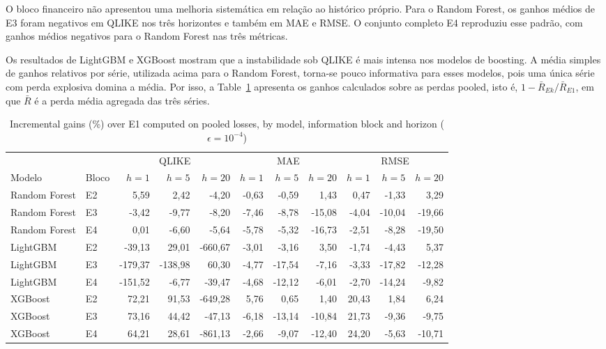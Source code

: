 \documentclass[a4paper,fleqn]{cas-sc}
\begin{document}
O bloco financeiro não apresentou uma melhoria sistemática em relação ao histórico próprio. Para o Random Forest, os ganhos médios de E3 foram negativos em QLIKE nos três horizontes e também em MAE e RMSE. O conjunto completo E4 reproduziu esse padrão, com ganhos médios negativos para o Random Forest nas três métricas.

Os resultados de LightGBM e XGBoost mostram que a instabilidade sob QLIKE é mais intensa nos modelos de boosting. A média simples de ganhos relativos por série, utilizada acima para o Random Forest, torna-se pouco informativa para esses modelos, pois uma única série com perda explosiva domina a média. Por isso, a Table~\ref{tab:ml_incremental_pooled} apresenta os ganhos calculados sobre as perdas pooled, isto é, \(1-\bar R_{Ek}/\bar R_{E1}\), em que \(\bar R\) é a perda média agregada das três séries.

\begin{table}[t]
\centering
\caption{Incremental gains (\%) over E1 computed on pooled losses, by model, information block and horizon (\(\epsilon=10^{-4}\))}
\label{tab:ml_incremental_pooled}
\scriptsize
\setlength{\tabcolsep}{3pt}
\begin{tabular*}{\textwidth}{@{\extracolsep{\fill}}llrrrrrrrrr@{}}
\hline
 & & \multicolumn{3}{c}{QLIKE} & \multicolumn{3}{c}{MAE} & \multicolumn{3}{c}{RMSE} \\
Modelo & Bloco & \(h=1\) & \(h=5\) & \(h=20\) & \(h=1\) & \(h=5\) & \(h=20\) & \(h=1\) & \(h=5\) & \(h=20\) \\
\hline
Random Forest & E2 & 5,59 & 2,42 & -4,20 & -0,63 & -0,59 & 1,43 & 0,47 & -1,33 & 3,29 \\
Random Forest & E3 & -3,42 & -9,77 & -8,20 & -7,46 & -8,78 & -15,08 & -4,04 & -10,04 & -19,66 \\
Random Forest & E4 & 0,01 & -6,60 & -5,64 & -5,78 & -5,32 & -16,73 & -2,51 & -8,28 & -19,50 \\
LightGBM & E2 & -39,13 & 29,01 & -660,67 & -3,01 & -3,16 & 3,50 & -1,74 & -4,43 & 5,37 \\
LightGBM & E3 & -179,37 & -138,98 & 60,30 & -4,77 & -17,54 & -7,16 & -3,33 & -17,82 & -12,28 \\
LightGBM & E4 & -151,52 & -6,77 & -39,47 & -4,68 & -12,12 & -6,01 & -2,70 & -14,24 & -9,82 \\
XGBoost & E2 & 72,21 & 91,53 & -649,28 & 5,76 & 0,65 & 1,40 & 20,43 & 1,84 & 6,24 \\
XGBoost & E3 & 73,16 & 44,42 & -47,13 & -6,18 & -13,14 & -10,84 & 21,73 & -9,36 & -9,75 \\
XGBoost & E4 & 64,21 & 28,61 & -861,13 & -2,66 & -9,07 & -12,40 & 24,20 & -5,63 & -10,71 \\
\hline
\end{tabular*}
\end{table}
\end{document}
